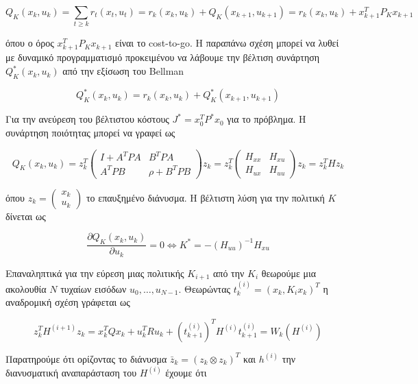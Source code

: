 \documentclass[a4paper,oneside,12pt]{article}
\begin{document}
\begin{equation}
Q_K(x_k, u_k) = \sum_{t \ge k} r_t(x_t, u_t) = r_k(x_k, u_k) + Q_K(x_{k+1}, u_{k+1}) = r_k(x_k, u_k) + x_{k+1}^TP_Kx_{k+1}
\end{equation}

όπου ο όρος $x_{k+1}^T P_K x_{k+1}$ είναι το cost-to-go. Η παραπάνω σχέση μπορεί να λυθεί με δυναμικό προγραμματισμό προκειμένου να λάβουμε την βέλτιση συνάρτηση $Q^*_K(x_k, u_k)$ από την εξίσωση του Bellman

$$Q_K^*(x_k, u_k) = r_k(x_k, u_k) + Q^*_K(x_{k+1}, u_{k+1})$$

Για την ανεύρεση του βέλτιστου κόστους $J^* = x_0^TP^*x_0$ για το πρόβλημα. Η συνάρτηση ποιότητας μπορεί να γραφεί ως

$$Q_K(x_k, u_k) = z_k^T\begin{pmatrix}
	I + A^TPA & B^T P A \\
	A^TPB & \rho + B^T P B 
\end{pmatrix}z_k = z_k^T\begin{pmatrix}
	H_{xx} & H_{xu} \\
	H_{ux} & H_{uu}

\end{pmatrix} z_k = z_k^T H z_k$$

όπου $z_k = \begin{pmatrix} x_k \\ u_k \end{pmatrix}$ το επαυξημένο διάνυσμα. Η βέλτιστη λύση για την πολιτική $K$ δίνεται ως

$$\frac {\partial Q_K(x_k, u_k)} {\partial u_k} = 0 \iff K^* = - (H_{uu})^{-1} H_{xu}$$

Επαναληπτικά για την εύρεση μιας πολιτικής $K_{i+1}$ από την $K_i$ θεωρούμε μια ακολουθία $N$ τυχαίων εισόδων $u_0, \dots, u_{N - 1}$. Θεωρώντας $t_{k}^{(i)} = (x_k, K_ix_k)^T$ η αναδρομική σχέση γράφεται ως 

$$z_k^T H^{(i+1)} z_k = x_k^T Q x_k + u_k^T R u_k + \left (t_{k+1}^{(i)} \right )^T H^{(i)} t_{k+1}^{(i)} = W_k (H^{(i)})$$

Παρατηρούμε ότι ορίζοντας το διάνυσμα $\bar z_k = (z_k \otimes z_k)^T$ και $h^{(i)}$ την διανυσματική αναπαράσταση του $H^{(i)}$ έχουμε ότι
\end{document}
